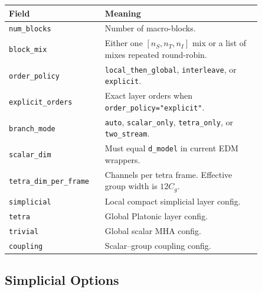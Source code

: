 \documentclass[11pt]{article}
\begin{document}
\begin{center}
\begin{tabular}{p{0.29\linewidth}p{0.56\linewidth}}
\toprule
Field & Meaning \\
\midrule
\texttt{num\_blocks} & Number of macro-blocks. \\
\texttt{block\_mix} & Either one \([n_S,n_T,n_I]\) mix or a list of mixes repeated round-robin. \\
\texttt{order\_policy} & \texttt{local\_then\_global}, \texttt{interleave}, or \texttt{explicit}. \\
\texttt{explicit\_orders} & Exact layer orders when \texttt{order\_policy="explicit"}. \\
\texttt{branch\_mode} & \texttt{auto}, \texttt{scalar\_only}, \texttt{tetra\_only}, or \texttt{two\_stream}. \\
\texttt{scalar\_dim} & Must equal \texttt{d\_model} in current EDM wrappers. \\
\texttt{tetra\_dim\_per\_frame} & Channels per tetra frame. Effective group width is \(12C_g\). \\
\texttt{simplicial} & Local compact simplicial layer config. \\
\texttt{tetra} & Global Platonic layer config. \\
\texttt{trivial} & Global scalar MHA config. \\
\texttt{coupling} & Scalar--group coupling config. \\
\bottomrule
\end{tabular}
\end{center}

\subsection{Simplicial Options}
\end{document}

